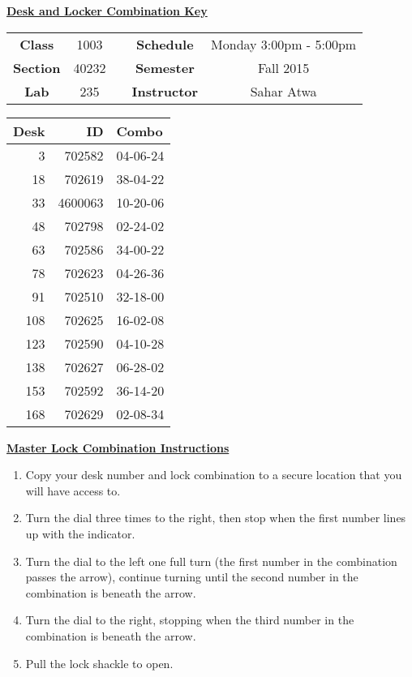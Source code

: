 \documentclass[12pt]{article}
\begin{document}
\thispagestyle{empty}

\begin{center}
	{\huge\textbf{\underline{ Desk and Locker Combination Key}}}
\end{center}


\begin{table}[h]
  \centering
  \begin{tabular}{ccccc}

  \textbf{Class} & 1003 & {\qquad} &\textbf{Schedule} & Monday 3:00pm - 5:00pm \\
  \textbf{Section} & 40232 & {\qquad} & \textbf{Semester} & Fall 2015 \\
  \textbf{Lab} & 235 & {\qquad} & \textbf{Instructor} & Sahar Atwa \\
  \end{tabular}
\end{table}
 \vspace{0.5in}
\begin{minipage}{0.4\textwidth}

\begin{tabular}{rrl}
\toprule
 Desk &       ID &     Combo \\
\midrule
    3 &   702582 &  04-06-24 \\
   18 &   702619 &  38-04-22 \\
   33 &  4600063 &  10-20-06 \\
   48 &   702798 &  02-24-02 \\
   63 &   702586 &  34-00-22 \\
   78 &   702623 &  04-26-36 \\
   91 &   702510 &  32-18-00 \\
  108 &   702625 &  16-02-08 \\
  123 &   702590 &  04-10-28 \\
  138 &   702627 &  06-28-02 \\
  153 &   702592 &  36-14-20 \\
  168 &   702629 &  02-08-34 \\
\bottomrule
\end{tabular}


\end{minipage}
\begin{minipage}{0.4\textwidth}
\underline{{\large \textbf{Master Lock Combination Instructions}}}
\begin{enumerate}
\item Copy your desk number and lock combination to a secure location that you will have access to.
\item Turn the dial three times to the right, then stop when the first number lines up with the indicator.
\item Turn the dial to the left one full turn (the first number in the combination passes the arrow), continue turning until the second number in the combination is beneath the arrow.
\item Turn the dial to the right, stopping when the third number in the combination is beneath the arrow.
\item Pull the lock shackle to open.
\end{enumerate}
\end{minipage}
\end{document}
